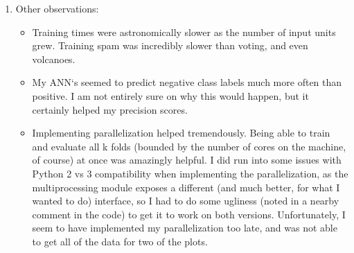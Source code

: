 \documentclass[12pt]{article}
\begin{document}
\begin{enumerate}
  \item Other observations:\\
    \begin{itemize}
      \item Training times were astronomically slower as the number of input
      units grew. Training spam was incredibly slower than voting, and even
      volcanoes.
      \item My ANN`s seemed to predict negative class labels much more often
      than positive. I am not entirely sure on why this would happen, but it
      certainly helped my precision scores.
      \item Implementing parallelization helped tremendously. Being able to
      train and evaluate all k folds (bounded by the number of cores on the
      machine, of course) at once was amazingly helpful. I did run into some
      issues with Python 2 vs 3 compatibility when implementing the
      parallelization, as the multiprocessing module exposes a different (and
      much better, for what I wanted to do) interface, so I had to do some
      ugliness (noted in a nearby comment in the code) to get it to work on
      both versions. Unfortunately, I seem to have implemented my
      parallelization too late, and was not able to get all of the data for
      two of the plots.
    \end{itemize}
\end{enumerate}
\end{document}
